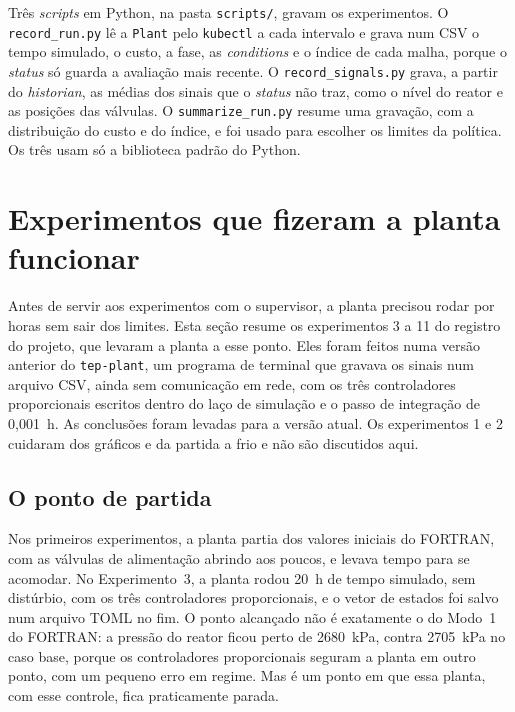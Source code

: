 Três \textit{scripts} em Python, na pasta \texttt{scripts/}, gravam os experimentos. O \texttt{record\_run.py} lê a \texttt{Plant} pelo \texttt{kubectl} a cada intervalo e grava num CSV o tempo simulado, o custo, a fase, as \textit{conditions} e o índice de cada malha, porque o \textit{status} só guarda a avaliação mais recente. O \texttt{record\_signals.py} grava, a partir do \textit{historian}, as médias dos sinais que o \textit{status} não traz, como o nível do reator e as posições das válvulas. O \texttt{summarize\_run.py} resume uma gravação, com a distribuição do custo e do índice, e foi usado para escolher os limites da política. Os três usam só a biblioteca padrão do Python.

\section{Experimentos que fizeram a planta funcionar}
\label{sec:experimentos_planta}

Antes de servir aos experimentos com o supervisor, a planta precisou rodar por horas sem sair dos limites. Esta seção resume os experimentos 3 a 11 do registro do projeto, que levaram a planta a esse ponto. Eles foram feitos numa versão anterior do \texttt{tep-plant}, um programa de terminal que gravava os sinais num arquivo CSV, ainda sem comunicação em rede, com os três controladores proporcionais escritos dentro do laço de simulação e o passo de integração de 0,001~h. As conclusões foram levadas para a versão atual. Os experimentos 1 e 2 cuidaram dos gráficos e da partida a frio e não são discutidos aqui.

\subsection{O ponto de partida}
\label{subsec:exp_partida}

Nos primeiros experimentos, a planta partia dos valores iniciais do FORTRAN, com as válvulas de alimentação abrindo aos poucos, e levava tempo para se acomodar. No Experimento~3, a planta rodou 20~h de tempo simulado, sem distúrbio, com os três controladores proporcionais, e o vetor de estados foi salvo num arquivo TOML no fim. O ponto alcançado não é exatamente o do Modo~1 do FORTRAN: a pressão do reator ficou perto de 2680~kPa, contra 2705~kPa no caso base, porque os controladores proporcionais seguram a planta em outro ponto, com um pequeno erro em regime. Mas é um ponto em que essa planta, com esse controle, fica praticamente parada.


